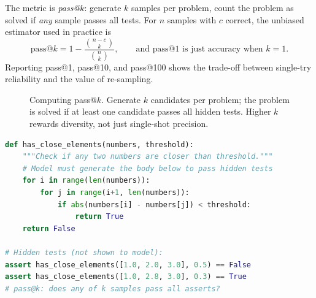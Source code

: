 The metric is \emph{pass@$k$}: generate $k$ samples per problem, count the problem as solved if \emph{any} sample passes all tests. For $n$ samples with $c$ correct, the unbiased estimator used in practice is
\[
\text{pass@}k = 1 - \frac{\binom{n-c}{k}}{\binom{n}{k}},\qquad
\text{and pass@1 is just accuracy when }k=1.
\]
Reporting pass@1, pass@10, and pass@100 shows the trade-off between single-try reliability and the value of re-sampling.

\begin{figure}[h]\centering
{}
\caption{Computing pass@$k$. Generate $k$ candidates per problem; the problem is solved if at least one candidate passes all hidden tests. Higher $k$ rewards diversity, not just single-shot precision.}
\label{fig:humaneval}
\end{figure}

\begin{lstlisting}[language=Python, caption={A HumanEval-style problem: the model must complete the function to pass hidden tests.}, label={lst:humaneval-ex}]
def has_close_elements(numbers, threshold):
    """Check if any two numbers are closer than threshold."""
    # Model must generate the body below to pass hidden tests
    for i in range(len(numbers)):
        for j in range(i+1, len(numbers)):
            if abs(numbers[i] - numbers[j]) < threshold:
                return True
    return False

# Hidden tests (not shown to model):
assert has_close_elements([1.0, 2.0, 3.0], 0.5) == False
assert has_close_elements([1.0, 2.8, 3.0], 0.3) == True
# pass@k: does any of k samples pass all asserts?
\end{lstlisting}

